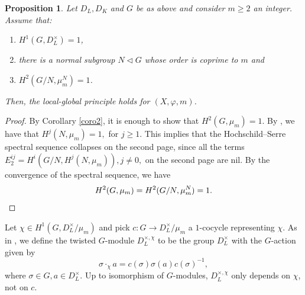\documentclass[a4paper,10pt]{amsart}
\theoremstyle{plain}
\newtheorem{proposition}[theorem]{Proposition}
\theoremstyle{definition}
\theoremstyle{remark}
\newcommand{\bD}{D_L}
\begin{document}
\begin{proposition}\label{prop3}
Let \(\bD, D_K\) and \(G\) be as above and consider \(m\geq 2\) an integer. Assume that:\
\begin{enumerate}
    \item \(H^1(G,\bD^\times) = 1\),
    \item there is a normal subgroup \(N \lhd G\) whose order is coprime to \(m\) and
    \item \(H^2(G/N, \mu_m^N) = 1\).
    
\end{enumerate} Then, the local-global principle holds for \((X, \varphi, m)\).   
\end{proposition}
\begin{proof}
By Corollary \ref{coro2}, it is enough to show that \(H^2(G,\mu_m) = 1\).
By \cite[Corollary 1, p.\ 105]{CF}, we have that \(H^j(N, \mu_m) = 1,\) for \(j \ge 1\). This implies that the Hochschild--Serre spectral sequence collapses on the second page, since all the terms \(E^{ij}_2 = H^i(G/N, H^j(N, \mu_m)), j \neq 0,\) on the second page are nil.  By the convergence of the spectral sequence, we have 
\[
        H^2(G, \mu_m) = H^2(G/N, \mu_m^N) = 1. \qedhere 
\]\end{proof}

Let \(\chi \in H^1(G, \bD^{\times}/\mu_m)\) and pick \(c \colon G \to \bD^\times/\mu_m\) a \(1\)-cocycle representing \(\chi\). As in \cite[\S5.3]{Serre-Galois}, we define the twisted \(G\)-module \(\bD^{\times, \chi}\) to be the group \(\bD^{\times}\) with the \(G\)-action given by
\[
    \sigma \cdot_\chi a = c(\sigma)\sigma(a)c(\sigma)^{-1}, 
\]
where \(\sigma \in G, a \in \bD^{\times}\). Up to isomorphism of \(G\)-modules, \(\bD^{\times, \chi}\) only depends on \(\chi\), not on \(c\).
\end{document}
